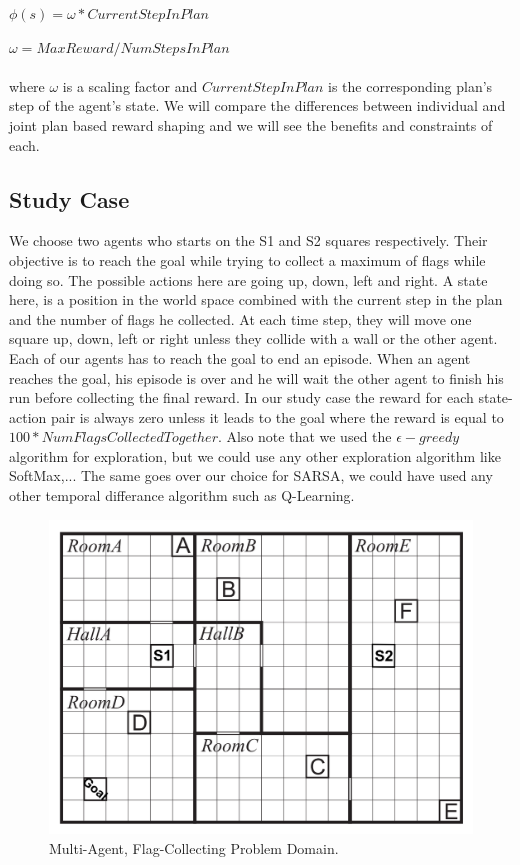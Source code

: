 \documentclass[letterpaper]{article}
\begin{document}
$\phi (s) = \omega * CurrentStepInPlan$

$\omega = MaxReward/NumStepsInPlan$\\\\
where $\omega$ is a scaling factor and $CurrentStepInPlan$ is the corresponding plan's step of the agent's state. We will compare the differences between individual and joint plan based reward shaping and we will see the benefits and constraints of each.



\subsection{Study Case}

We choose two agents who starts on the S1 and S2 squares respectively. Their objective is to reach the goal while trying to collect a maximum of flags while doing so. The possible actions here are going up, down, left and right. A state here, is a position in the world space combined with the current step in the plan and the number of flags he collected. At each time step, they will move one square up, down, left or right unless they collide with a wall or the other agent. Each of our agents has to reach the goal to end an episode. When an agent reaches the goal, his episode is over and he will wait the other agent to finish his run before collecting the final reward. In our study case the reward for each state-action pair is always zero unless it leads to the goal where the reward is equal to $100*NumFlagsCollectedTogether$. Also note that we used the $\epsilon -greedy$ algorithm for exploration, but we could use any other exploration algorithm like SoftMax,... The same goes over our choice for SARSA, we could have used any other temporal differance algorithm such as Q-Learning.

\begin{figure}[h!]
\centering
  \includegraphics[width=0.75\linewidth]{img/stydyCase.png}
  \caption{Multi-Agent, Flag-Collecting Problem Domain.}
  \label{fig:studycase1}
\end{figure}
\end{document}
